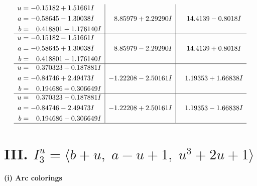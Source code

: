 \documentclass[1p]{elsarticle_modified}
\theoremstyle{definition}
\begin{document}
$$\begin{array}{c|c|c}
\begin{aligned}
u &= -0.15182 + 1.51661 I \\
a &= -0.58645 - 1.30038 I \\
b &= \phantom{-}0.418801 + 1.176140 I\end{aligned}
 & \phantom{-}8.85979 + 2.29290 I & \phantom{-}14.4139 - 0.8018 I \\ \hline\begin{aligned}
u &= -0.15182 - 1.51661 I \\
a &= -0.58645 + 1.30038 I \\
b &= \phantom{-}0.418801 - 1.176140 I\end{aligned}
 & \phantom{-}8.85979 - 2.29290 I & \phantom{-}14.4139 + 0.8018 I \\ \hline\begin{aligned}
u &= \phantom{-}0.370323 + 0.187881 I \\
a &= -0.84746 + 2.49473 I \\
b &= \phantom{-}0.194686 + 0.306649 I\end{aligned}
 & -1.22208 - 2.50161 I & \phantom{-}1.19353 + 1.66838 I \\ \hline\begin{aligned}
u &= \phantom{-}0.370323 - 0.187881 I \\
a &= -0.84746 - 2.49473 I \\
b &= \phantom{-}0.194686 - 0.306649 I\end{aligned}
 & -1.22208 + 2.50161 I & \phantom{-}1.19353 - 1.66838 I\\
 \hline 
 \end{array}$$\newpage\newpage\renewcommand{\arraystretch}{1}
\centering \section*{III. $I^u_{3}= \langle b+u,\;a- u+1,\;u^3+2 u+1 \rangle$}
\flushleft \textbf{(i) Arc colorings}\\
\end{document}
